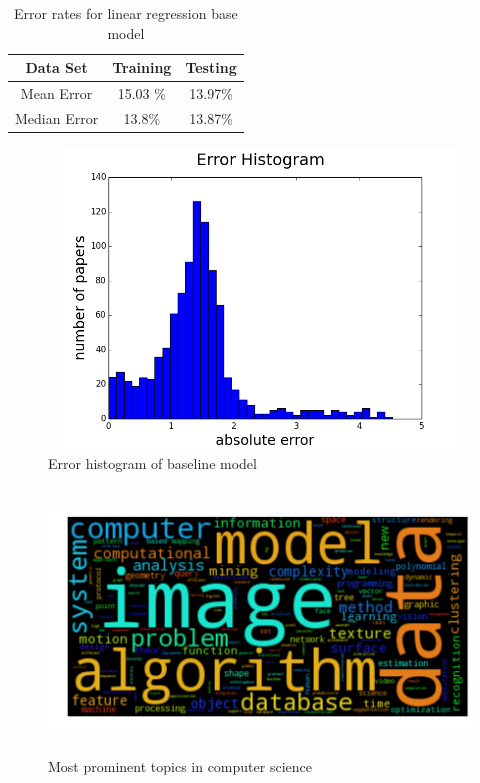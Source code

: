 \documentclass[a4paper, 11pt]{article}
\begin{document}
\begin{table}[h!]
\centering
\begin{tabular}{||c c c ||} 
 \hline
 Data Set & Training &  Testing \\ [0.5ex] 
 \hline\hline
 Mean Error &  15.03 \%& 13.97\% \\ [1ex] 
Median Error & 13.8\%  & 13.87\% \\ [1ex] 
 \hline
\end{tabular}
\caption{Error rates for linear regression base model}
\label{table:1}
\end{table}
\begin{figure}[h]
    \centering
    \includegraphics[width=17cm,height=8cm]{figure_1}
    \caption{Error histogram of baseline model}
    \label{fig:errorhistogram}
\end{figure}
\begin{figure}[h]
    \centering
    \includegraphics[width=16cm,height=7cm]{venue-image}
    \caption{Most prominent topics in computer science}
    \label{fig:venue}
\end{figure}
\end{document}
